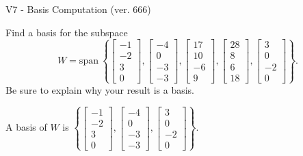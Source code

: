 \begin{exercise}
  \begin{exerciseTitle}V7 - Basis Computation (ver. 666)\end{exerciseTitle}
  \begin{exerciseStatement}
    Find a basis for the subspace 
\[W=\mathrm{span}\ \left\{\left[\begin{array}{r}
-1 \\
-2 \\
3 \\
0
\end{array}\right] , \left[\begin{array}{r}
-4 \\
0 \\
-3 \\
-3
\end{array}\right] , \left[\begin{array}{r}
17 \\
10 \\
-6 \\
9
\end{array}\right] , \left[\begin{array}{r}
28 \\
8 \\
6 \\
18
\end{array}\right] , \left[\begin{array}{r}
3 \\
0 \\
-2 \\
0
\end{array}\right]\right\}.\]
 Be sure to explain why your result is a basis.


  \end{exerciseStatement}
  \begin{exerciseAnswer}
   A basis of \(W\) is  \(\left\{\left[\begin{array}{r}
-1 \\
-2 \\
3 \\
0
\end{array}\right] , \left[\begin{array}{r}
-4 \\
0 \\
-3 \\
-3
\end{array}\right] , \left[\begin{array}{r}
3 \\
0 \\
-2 \\
0
\end{array}\right]\right\}\).
  


  \end{exerciseAnswer}
\end{exercise}